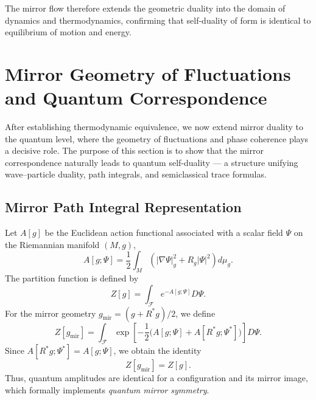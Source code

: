 The mirror flow therefore extends the geometric duality
into the domain of dynamics and thermodynamics,
confirming that self-duality of form
is identical to equilibrium of motion and energy.


\section{Mirror Geometry of Fluctuations and Quantum Correspondence}\relax \hspace{0pt}

After establishing thermodynamic equivalence,
we now extend mirror duality to the quantum level,
where the geometry of fluctuations and phase coherence
plays a decisive role.
The purpose of this section is to show that
the mirror correspondence naturally leads to
quantum self-duality — a structure unifying
wave–particle duality, path integrals,
and semiclassical trace formulas.

\subsection{Mirror Path Integral Representation}\relax \hspace{0pt}

Let \(A[g]\) be the Euclidean action functional
associated with a scalar field \(\Psi\)
on the Riemannian manifold \((M,g)\),
\[
A[g;\Psi]
=\frac{1}{2}\int_{M}
\left(|\nabla\Psi|_{g}^{2}+R_{g}|\Psi|^{2}\right)d\mu_{g}.
\]
The partition function is defined by
\[
Z[g]
=\int_{\mathcal{F}}e^{-A[g;\Psi]}D\Psi.
\]
For the mirror geometry \(g_{\mathrm{mir}}=(g+R^{*}g)/2\),
we define
\[
Z[g_{\mathrm{mir}}]
=\int_{\mathcal{F}}
\exp\!\left[-\frac{1}{2}
\big(A[g;\Psi]+A[R^{*}g;\Psi^{*}]\big)\right]D\Psi.
\]
Since \(A[R^{*}g;\Psi^{*}]=A[g;\Psi]\),
we obtain the identity
\begin{equation}
Z[g_{\mathrm{mir}}]=Z[g].
\end{equation}
Thus, quantum amplitudes are identical
for a configuration and its mirror image,
which formally implements \emph{quantum mirror symmetry}.

